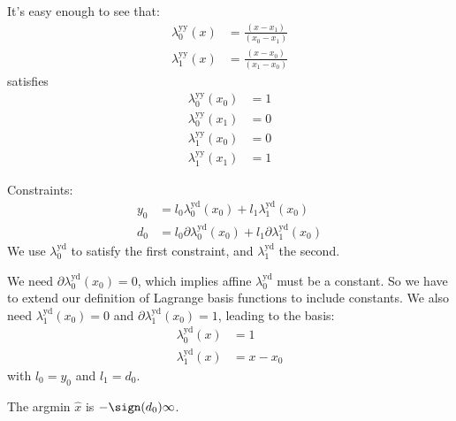 
It's easy enough to see that:
\begin{align}
\lambda^{\text{yy}}_0(x) & = \frac {(x - x_1)} {(x_0 - x_1)} \\
\lambda^{\text{yy}}_1(x) & = \frac {(x - x_0)} {(x_1 - x_0)} \nonumber
\end{align}
satisfies
\begin{align}
\lambda^{\text{yy}}_0(x_0) & = 1 \\
\lambda^{\text{yy}}_0(x_1) & = 0 \nonumber \\
\lambda^{\text{yy}}_1(x_0) & = 0 \nonumber \\
\lambda^{\text{yy}}_1(x_1) & = 1 \nonumber 
\end{align}


Constraints:
\begin{equation}
\begin{aligned}
y_0 & = l_0 \lambda^{\text{yd}}_0 (x_0) + l_1 \lambda^{\text{yd}}_1 (x_0) 
\\
d_0 & = l_0 \partial\lambda^{\text{yd}}_0 (x_0) + l_1 \partial\lambda^{\text{yd}}_1 (x_0) 
\end{aligned}
\end{equation}
We use $\lambda^{\text{yd}}_0$ to satisfy the first constraint,
and $\lambda^{\text{yd}}_1$ the second.

We need $\partial\lambda^{\text{yd}}_0 (x_0) = 0$,
which implies affine $\lambda^{\text{yd}}_0$ 
must be a constant.
So we have to extend our definition of Lagrange basis functions
to include constants.
We also need $\lambda^{\text{yd}}_1 (x_0) = 0$ and
$\partial\lambda^{\text{yd}}_1 (x_0) = 1$, leading to the basis:
\begin{align}
\lambda^{\text{yd}}_0 (x) & = 1 \\
\lambda^{\text{yd}}_1 (x) & = x - x_0 \nonumber
\end{align}
with $l_0 = y_0$ and $l_1 = d_0$.

The argmin $\hat{x}$ is $-\sign(d_0)\infty$.


